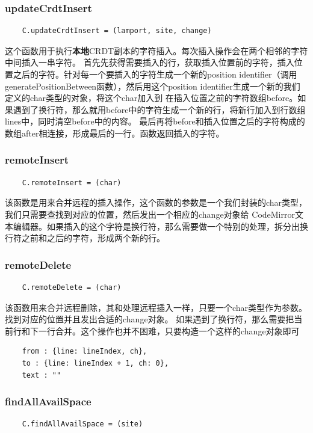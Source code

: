 \documentclass[11pt]{ctexart}
\begin{document}
\subsubsection{\textsf{updateCrdtInsert}}
\begin{verbatim}
    C.updateCrdtInsert = (lamport, site, change)
\end{verbatim}

这个函数用于执行\textbf{本地}CRDT副本的字符插入。每次插入操作会在两个相邻的字符中间插入一串字符。
首先先获得需要插入的行，获取插入位置前的字符，插入位置之后的字符。针对每一个要插入的字符生成一个新的position identifier（调用
\textsf{generatePositionBetween}函数），然后用这个position identifier生成一个新的我们定义的char类型的对象，将这个char加入到
在插入位置之前的字符数组before。如果遇到了换行符，那么就用before中的字符生成一个新的行，将新行加入到行数组lines中，同时清空before中的内容。
最后再将before和插入位置之后的字符构成的数组after相连接，形成最后的一行。函数返回插入的字符。

\subsubsection{\textsf{remoteInsert}}
\begin{verbatim}
    C.remoteInsert = (char)
\end{verbatim}

该函数是用来合并远程的插入操作，这个函数的参数是一个我们封装的char类型，我们只需要查找到对应的位置，然后发出一个相应的change对象给
CodeMirror文本编辑器。如果插入的这个字符是换行符，那么需要做一个特别的处理，拆分出换行符之前和之后的字符，形成两个新的行。
\subsubsection{\textsf{remoteDelete}}
\begin{verbatim}
    C.remoteDelete = (char)
\end{verbatim}

该函数用来合并远程删除，其和处理远程插入一样，只要一个char类型作为参数。找到对应的位置并且发出合适的change对象。
如果遇到了换行符，那么需要把当前行和下一行合并。这个操作也并不困难，只要构造一个这样的change对象即可
\begin{verbatim}
    from : {line: lineIndex, ch}, 
    to : {line: lineIndex + 1, ch: 0}, 
    text : ""
\end{verbatim}

\subsubsection{\textsf{findAllAvailSpace}}
\begin{verbatim}
    C.findAllAvailSpace = (site)
\end{verbatim}
\end{document}
